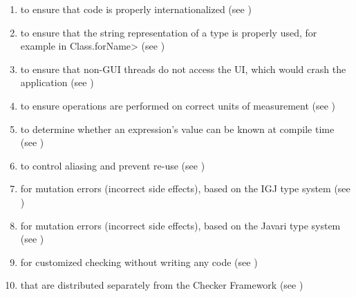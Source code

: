 \begin{enumerate}
\item
   to
  ensure that code is properly internationalized (see
  )
\item
   to ensure that the
  string representation of a type is properly used, for example in
  \<Class.forName> (see )
\item
   to ensure that non-GUI
  threads do not access the UI, which would crash the application
  (see )
\item
   to ensure operations are
  performed on correct units of measurement
  (see )
\item
   to determine
  whether an expression's value can be known at compile time
  (see )
\item
   to control aliasing and prevent
  re-use (see )
\item
   for mutation errors (incorrect
  side effects), based on the IGJ type system (see
  )
\item
   for mutation errors
  (incorrect side effects), based on the Javari type system (see
  )
\item
   for customized checking without
  writing any code (see )
\item
   that are distributed
  separately from the Checker Framework
  (see )

\end{enumerate}

